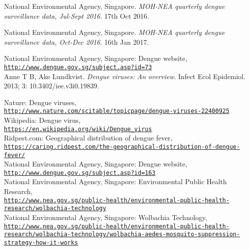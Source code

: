 \documentclass[11pt]{exam}
\begin{document}
\begin{thebibliography}{28}
National Environmental Agency, Singapore.
\textit{MOH-NEA quarterly dengue surveillance data, Jul-Sept 2016}.
17th Oct 2016.

 
National Environmental Agency, Singapore.
\textit{MOH-NEA quarterly dengue surveillance data, Oct-Dec 2016}.
16th Jan 2017.
 
National Environmental Agency, Singapore: Dengue website,
\\\texttt{\url{http://www.dengue.gov.sg/subject.asp?id=73}}\\

Anne T B, Ake Lundkvist.
\textit{Dengue viruses: An overview}.
Infect Ecol Epidemiol. 2013; 3: 10.3402/iee.v3i0.19839.
 
Nature: Dengue viruses,
\\\texttt{\url{http://www.nature.com/scitable/topicpage/dengue-viruses-22400925}}\\
 
Wikipedia: Dengue virus,
\\\texttt{\url{https://en.wikipedia.org/wiki/Dengue_virus}}\\
 
Ridpest.com: Geographical distribution of dengue fever,
\\\texttt{\url{https://caring.ridpest.com/the-geographical-distribution-of-dengue-fever/}}\\
 
National Environmental Agency, Singapore: Dengue website,
\\\texttt{\url{http://www.dengue.gov.sg/subject.asp?id=163}} \\
 
National Environmental Agency, Singapore: Environmental Public Health Research, 
\\\texttt{\url{http://www.nea.gov.sg/public-health/environmental-public-health-research/wolbachia-technology}} \\
 
National Environmental Agency, Singapore: Wolbachia Technology,  
\\\texttt{\url{http://www.nea.gov.sg/public-health/environmental-public-health-research/wolbachia-technology/wolbachia-aedes-mosquito-suppression-strategy-how-it-works}} \\


\end{thebibliography}
\end{document}

